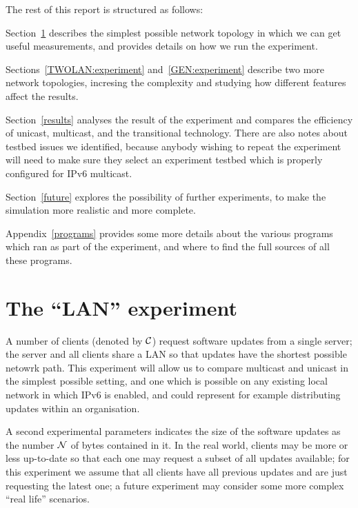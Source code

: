 \documentclass[a4paper,12pt]{article}
\begin{document}
The rest of this report is structured as follows:

Section~\ref{LAN:experiment} describes the simplest possible network
topology in which we can get useful measurements, and provides details
on how we run the experiment.

Sections~\ref{TWOLAN:experiment} and~\ref{GEN:experiment} describe
two more network topologies, incresing the complexity and studying
how different features affect the results.

Section~\ref{results} analyses the result of the experiment and compares
the efficiency of unicast, multicast, and the transitional technology.
There are also notes about testbed issues we identified, because anybody
wishing to repeat the experiment will need to make sure they select
an experiment testbed which is properly configured for IPv6 multicast.

Section~\ref{future} explores the possibility of further experiments,
to make the simulation more realistic and more complete.

Appendix~\ref{programs} provides some more details about the various
programs which ran as part of the experiment, and where to find the
full sources of all these programs.

\section{The ``LAN'' experiment}
\label{LAN:experiment}

A number of clients (denoted by ${\cal C}$) request software updates
from a single server; the server and all clients share a LAN
so that updates have the shortest possible netowrk path.  This
experiment will allow us to compare multicast and unicast in the
simplest possible setting, and one which is possible on any existing
local network in which IPv6 is enabled, and could represent for example
distributing updates within an organisation.

A second experimental parameters indicates the size of the software updates
as the number ${\cal N}$ of bytes contained in it.  In the real world,
clients may be more or less up-to-date so that each one may request a
subset of all updates available; for this experiment we assume that
all clients have all previous updates and are just requesting the latest
one; a future experiment may consider some more complex ``real life''
scenarios.
\end{document}
